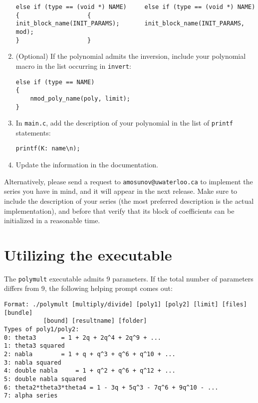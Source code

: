 \documentclass[a4paper,10pt]{article}
\newcommand{\code}{\lstinline}
\begin{document}
\begin{enumerate}
\begin{lstlisting}
else if (type == (void *) NAME)		else if (type == (void *) NAME)
{					{
init_block_name(INIT_PARAMS);		init_block_name(INIT_PARAMS, mod);
}					}
\end{lstlisting}

\item (Optional) If the polynomial admits the inversion, include your polynomial macro in the list occurring in \code{invert}:

\begin{lstlisting}
else if (type == NAME)
{
	nmod_poly_name(poly, limit);
}
\end{lstlisting}

\item In \code{main.c}, add the description of your polynomial in the list of \code{printf} statements:

\begin{lstlisting}
printf(K: name\n);
\end{lstlisting}

\item Update the information in the documentation.
\end{enumerate}

Alternatively, please send a request to \code{amosunov@uwaterloo.ca} to implement the series you have in mind, and it will appear in the next release. Make sure to include the description of your series (the most preferred description is the actual implementation), and before that verify that its block of coefficients can be initialized in a reasonable time.

\section{Utilizing the executable} \label{sec:polymult_exe}

The \code{polymult} executable admits 9 parameters. If the total number of parameters differs from 9, the following helping prompt comes out:

\begin{lstlisting}
Format: ./polymult [multiply/divide] [poly1] [poly2] [limit] [files] [bundle]
		   [bound] [resultname] [folder]
Types of poly1/poly2:
0: theta3		= 1 + 2q + 2q^4 + 2q^9 + ...
1: theta3 squared
2: nabla		= 1 + q + q^3 + q^6 + q^10 + ...
3: nabla squared
4: double nabla		= 1 + q^2 + q^6 + q^12 + ...
5: double nabla squared
6: theta2*theta3*theta4	= 1 - 3q + 5q^3 - 7q^6 + 9q^10 - ...
7: alpha series
\end{lstlisting}
\end{document}
